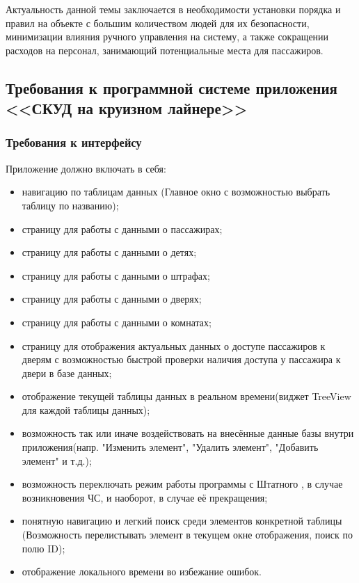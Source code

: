 Актуальность данной темы заключается в необходимости установки порядка и правил на объекте с большим количеством людей для их безопасности, минимизации влияния ручного управления на систему, а также сокращении расходов на персонал, занимающий потенциальные места для пассажиров.

\subsection{Требования к программной системе приложения <<СКУД на круизном лайнере>>}
\subsubsection{Требования к интерфейсу}

Приложение должно включать в себя:
\begin{itemize}
	\item навигацию по таблицам данных (Главное окно с возможностью выбрать таблицу по названию);
	\item страницу для работы с данными о пассажирах;
	\item страницу для работы с данными о детях;
	\item страницу для работы с данными о штрафах;
	\item страницу для работы с данными о дверях;
	\item страницу для работы с данными о комнатах;
	\item страницу для отображения актуальных данных о доступе пассажиров к дверям с возможностью быстрой проверки наличия доступа у пассажира к двери в базе данных;
	\item отображение текущей таблицы данных в реальном времени(виджет TreeView для каждой таблицы данных);
	\item возможность так или иначе воздействовать на внесённые данные базы внутри приложения(напр. "Изменить элемент", "Удалить элемент", "Добавить элемент" и т.д.);
	\item возможность переключать режим работы программы с \textquotedbl Штатного \textquotedbl, в случае возникновения ЧС, и наоборот, в случае её прекращения;
	\item понятную навигацию и легкий поиск среди элементов конкретной таблицы (Возможность перелистывать элемент в текущем окне отображения, поиск по полю ID);
	\item отображение локального времени во избежание ошибок.
\end{itemize}

